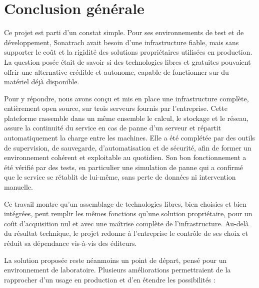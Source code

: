 \chapter*{Conclusion générale}

\par Ce projet est parti d'un constat simple. Pour ses environnements de test et de développement, Sonatrach avait besoin d'une infrastructure fiable, mais sans supporter le coût et la rigidité des solutions propriétaires utilisées en production. La question posée était de savoir si des technologies libres et gratuites pouvaient offrir une alternative crédible et autonome, capable de fonctionner sur du matériel déjà disponible.\\

\par Pour y répondre, nous avons conçu et mis en place une infrastructure complète, entièrement open source, sur trois serveurs fournis par l'entreprise. Cette plateforme rassemble dans un même ensemble le calcul, le stockage et le réseau, assure la continuité du service en cas de panne d'un serveur et répartit automatiquement la charge entre les machines. Elle a été complétée par des outils de supervision, de sauvegarde, d'automatisation et de sécurité, afin de former un environnement cohérent et exploitable au quotidien. Son bon fonctionnement a été vérifié par des tests, en particulier une simulation de panne qui a confirmé que le service se rétablit de lui-même, sans perte de données ni intervention manuelle.\\

\par Ce travail montre qu'un assemblage de technologies libres, bien choisies et bien intégrées, peut remplir les mêmes fonctions qu'une solution propriétaire, pour un coût d'acquisition nul et avec une maîtrise complète de l'infrastructure. Au-delà du résultat technique, le projet redonne à l'entreprise le contrôle de ses choix et réduit sa dépendance vis-à-vis des éditeurs.\\

\par La solution proposée reste néanmoins un point de départ, pensé pour un environnement de laboratoire. Plusieurs améliorations permettraient de la rapprocher d'un usage en production et d'en étendre les possibilités :\\

